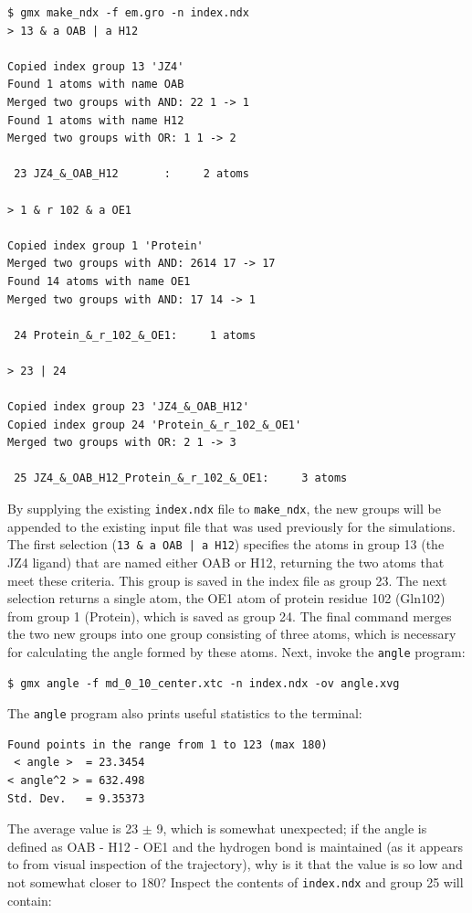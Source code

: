 \documentclass[9pt,tutorial,pubversion]{livecoms}
\begin{document}
\begin{lstlisting}[basicstyle=\footnotesize\ttfamily]
$ gmx make_ndx -f em.gro -n index.ndx 
> 13 & a OAB | a H12

Copied index group 13 'JZ4'
Found 1 atoms with name OAB
Merged two groups with AND: 22 1 -> 1
Found 1 atoms with name H12
Merged two groups with OR: 1 1 -> 2

 23 JZ4_&_OAB_H12       :     2 atoms

> 1 & r 102 & a OE1

Copied index group 1 'Protein'
Merged two groups with AND: 2614 17 -> 17
Found 14 atoms with name OE1
Merged two groups with AND: 17 14 -> 1

 24 Protein_&_r_102_&_OE1:     1 atoms

> 23 | 24

Copied index group 23 'JZ4_&_OAB_H12'
Copied index group 24 'Protein_&_r_102_&_OE1'
Merged two groups with OR: 2 1 -> 3

 25 JZ4_&_OAB_H12_Protein_&_r_102_&_OE1:     3 atoms
\end{lstlisting}
%
By supplying the existing \texttt{index.ndx} file to \texttt{make\_ndx}, the new groups will be appended to the existing input file that was used previously for the simulations. The first selection (\texttt{13 \& a OAB | a H12}) specifies the atoms in group 13 (the JZ4 ligand) that are named either OAB or H12, returning the two atoms that meet these criteria. This group is saved in the index file as group 23. The next selection returns a single atom, the OE1 atom of protein residue 102 (Gln102) from group 1 (Protein), which is saved as group 24. The final command merges the two new groups into one group consisting of three atoms, which is necessary for calculating the angle formed by these atoms. Next, invoke the \texttt{angle} program:

\begin{lstlisting}
$ gmx angle -f md_0_10_center.xtc -n index.ndx -ov angle.xvg  
\end{lstlisting}
%
The \texttt{angle} program also prints useful statistics to the terminal:

\begin{lstlisting}
Found points in the range from 1 to 123 (max 180)
 < angle >  = 23.3454
< angle^2 > = 632.498
Std. Dev.   = 9.35373
\end{lstlisting}
%
The average value is 23 $\pm$ 9\textdegree, which is somewhat unexpected; if the angle is defined as OAB - H12 - OE1 and the hydrogen bond is maintained (as it appears to from visual inspection of the trajectory), why is it that the value is so low and not somewhat closer to 180\textdegree? Inspect the contents of \texttt{index.ndx} and group 25 will contain:
\end{document}
